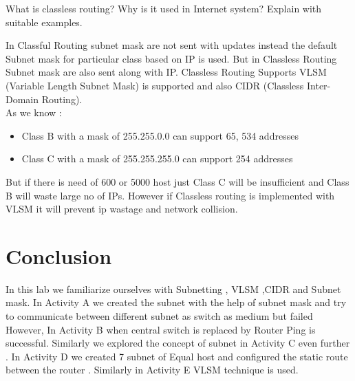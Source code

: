 \documentclass[a4paper,11pt]{article}
\begin{document}

\begin{Q}
    {
        What is classless routing? Why is it used in Internet system? Explain with suitable
        examples.
    }
\end{Q}

\begin{A}
    {
        In Classful Routing subnet mask are not sent with updates instead the default Subnet mask for particular class based on IP is used. But in Classless Routing Subnet mask are also sent along with IP. Classless Routing Supports VLSM (Variable Length Subnet Mask) is supported and also CIDR (Classless Inter-Domain Routing).\\

        As we know :
        \begin{itemize}
            \item Class B with a mask of 255.255.0.0 can support 65, 534 addresses
            \item Class C with a mask of 255.255.255.0 can support 254 addresses
        \end{itemize}

        But if there is need of 600  or 5000  host just Class C will be insufficient and Class B will waste large no of IPs. However if Classless routing is implemented with VLSM it will prevent ip wastage and network collision.

    }
\end{A}


\pagebreak

\section{Conclusion}


In this lab we familiarize ourselves with Subnetting , VLSM ,CIDR and Subnet mask. In Activity A we created the subnet with the help of subnet mask and try to communicate between different subnet as switch as medium but failed However, In Activity B when  central switch is replaced by Router Ping is successful. Similarly we explored the concept of subnet in Activity C even further . In Activity D we created 7 subnet of Equal host  and configured the static route between the router . Similarly in Activity E VLSM technique is used.
\end{document}
